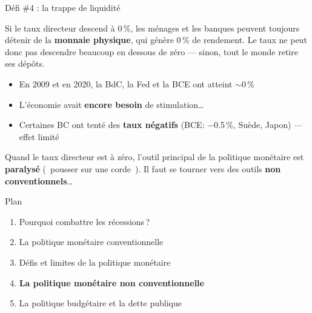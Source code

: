 \documentclass[aspectratio=169]{beamer}
\begin{document}
\begin{frame}[t]{Défi \#4 : la trappe de liquidité}\examtag
   \small
   \vspace{-0.25cm}
   \begin{defbox}
      \footnotesize Si le taux directeur descend à 0\,\%, les ménages et les banques peuvent toujours détenir de la \textbf{monnaie physique}, qui génère 0\,\% de rendement. Le taux ne peut donc pas descendre beaucoup en dessous de zéro --- sinon, tout le monde retire ses dépôts.
   \end{defbox}
   \begin{itemize}
      \setlength\itemsep{0.1cm}
      \item En 2009 et en 2020, la BdC, la Fed et la BCE ont atteint $\sim$0\,\%
      \item L'économie avait \textbf{encore besoin} de stimulation\ldots
      \item Certaines BC ont tenté des \textbf{taux négatifs} (BCE: $-$0.5\,\%, Suède, Japon) --- effet limité
   \end{itemize}
   \vspace{0.05cm}
   \begin{keyinsight}
      \footnotesize Quand le taux directeur est à zéro, l'outil principal de la politique monétaire est \textbf{paralysé} (\guillemotleft~pousser sur une corde~\guillemotright). Il faut se tourner vers des outils \textbf{non conventionnels}\ldots
   \end{keyinsight}
\end{frame}


\begin{frame}{Plan}
   \begin{enumerate}
      \setlength\itemsep{0.5cm}
      \item {\color{gray!50}Pourquoi combattre les récessions\,?}
      \item {\color{gray!50}La politique monétaire conventionnelle}
      \item {\color{gray!50}Défis et limites de la politique monétaire}
      \item \textbf{La politique monétaire non conventionnelle}
      \item La politique budgétaire et la dette publique
   \end{enumerate}
\end{frame}

\end{document}
